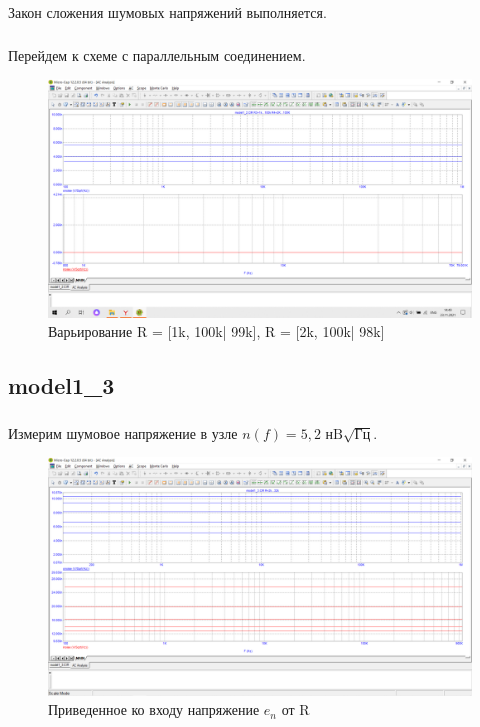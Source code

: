 \documentclass[a4paper, 12pt]{article}%
\begin{document}
Закон сложения шумовых напряжений выполняется.

\subsubsection{}
 
Перейдем к схеме с параллельным соединением.

\begin{figure}[h!]
    \centering
    \includegraphics[scale = 0.4 \textwidth]{images/mod1_2_2.png}
    \caption{Варьирование R = [1k, 100k| 99k], R = [2k, 100k| 98k]}
    \label{fig:1_2_2}
\end{figure}

\subsection{\textbf{model1\_3}}

\subsubsection{}

Измерим шумовое напряжение в узле $n(f) = 5,2 \text{ нB}\sqrt{\text{Гц}}$. 


\begin{figure}[h!]
    \centering
    \includegraphics[scale = 0.4 \textwidth]{images/mod1_3_1.png}
    \caption{Приведенное ко входу напряжение $e_n$ от R}
    \label{fig:1_3_1}
\end{figure}
\end{document}
